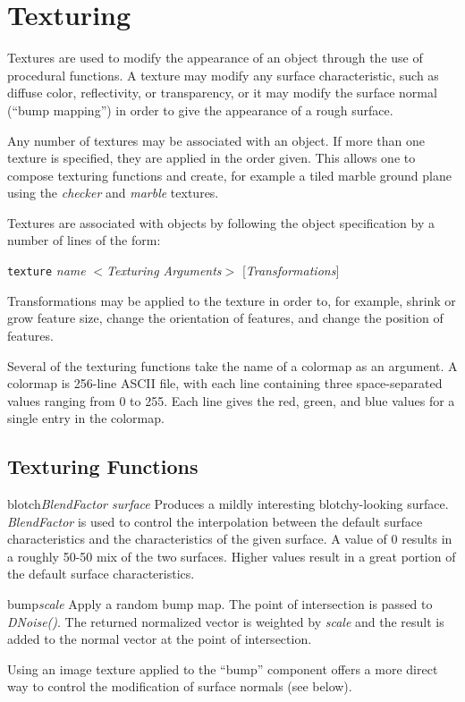 \chapter {Texturing}

Textures are used to modify the appearance of an object through the
use of procedural functions.  A texture may modify any surface characteristic,
such as diffuse color, reflectivity, or transparency, or it may 
modify the surface normal (``bump mapping'') in order to give the
appearance of a rough surface.

Any number of textures may be associated with an object.  If more than
one texture is specified, they are applied in the order given.  This allows
one to compose texturing functions and create, for example
a tiled marble ground plane using the {\em checker} and {\em marble}
textures.

Textures are associated with objects by following the object specification
by a number of lines of the form:

\begin{center}
{\tt texture} {\em name} $<${\em Texturing Arguments}$>$ [{\em Transformations}]
\end{center}

Transformations may be applied to the texture in order to, for example,
shrink or grow feature size, change the orientation of features, and
change the position of features.

Several of the texturing functions take the name of a colormap as an
argument.  A colormap is 256-line ASCII file, with each line containing
three space-separated values ranging from 0 to 255.  Each line gives
the red, green, and blue values for a single entry in the colormap.

\section {Texturing Functions}

\begin{defkey}{blotch}{{\em BlendFactor surface}}
Produces a mildly interesting blotchy-looking surface.
{\em BlendFactor} is used to control the interpolation between
the default surface characteristics and the characteristics of
the given surface.  A value of 0 results in a roughly 50-50 mix
of the two surfaces.  Higher values result in a great portion of
the default surface characteristics.
\end{defkey}

\begin{defkey}{bump}{{\em scale}}
Apply a random bump map.  The point of intersection is passed to
{\em DNoise()}.
The returned normalized vector is weighted by {\em scale}
and the result is added to the normal vector at the point of intersection.
\end{defkey}
Using an image texture applied to the ``bump'' component offers a more
direct way to control the modification of surface normals (see below).

